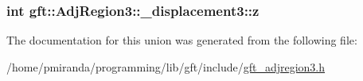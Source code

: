 \subsubsection[{\texorpdfstring{z}{z}}]{\setlength{\rightskip}{0pt plus 5cm}int gft\+::\+Adj\+Region3\+::\+\_\+displacement3\+::z}\hypertarget{uniongft_1_1AdjRegion3_1_1__displacement3_a05b4db47be0e60b35bf377f9af225edf}{}\label{uniongft_1_1AdjRegion3_1_1__displacement3_a05b4db47be0e60b35bf377f9af225edf}


The documentation for this union was generated from the following file\+:\begin{DoxyCompactItemize}
\item 
/home/pmiranda/programming/lib/gft/include/\hyperlink{gft__adjregion3_8h}{gft\+\_\+adjregion3.\+h}\end{DoxyCompactItemize}
